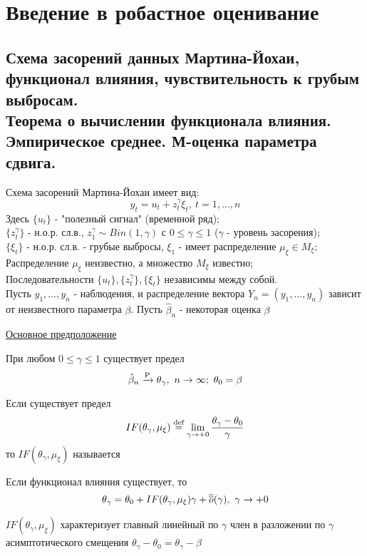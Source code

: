 \section{Введение в робастное оценивание}

\subsection{Схема засорений данных Мартина-Йохаи, функционал влияния,
чувствительность к грубым выбросам. \\
Теорема о вычислении функционала влияния. \\
Эмпирическое среднее. М-оценка параметра сдвига.}
Схема засорений Мартина-Йохаи имеет вид:
\[y_t = u_t + z^\gamma_t\xi_t,\ t = 1, \ldots, n\]
Здесь $\{u_t\}$ - "полезный сигнал" (временной ряд); \\
$\{z_t^\gamma\}$ - н.о.р. сл.в., $z_1^{\gamma} \sim Bin(1, \gamma)$
с $0 \leq \gamma\leq1$ ($\gamma$ - уровень засорения); \\
$\{\xi_t\}$ - н.о.р. сл.в. - грубые выбросы, $\xi_1$ - имеет распределение
$\mu_\xi\in M_\xi$;
Распределение $\mu_\xi$ неизвестно, а множество $M_\xi$ известно; \\
Последовательности $\{u_t\}, \{z^\gamma_t\}, \{\xi_t\}$ независимы между собой. \\
Пусть $y_1, \ldots, y_n$ - наблюдения, и распределение
вектора $Y_n=(y_1, \ldots, y_n)$ зависит от неизвестного параметра $\beta$.
Пусть $\hat{\beta}_n$ - некоторая оценка $\beta$

\underline{Основное предположение}

При любом $0 \leq \gamma\leq1$ существует предел
\[\hat{\beta}_n\xrightarrow{\P}\theta_\gamma,\ n\rightarrow\infty;\ \theta_0=\beta\]

\begin{definition}
    Если существует предел
    \[IF(\theta_\gamma, \mu_\xi)\stackrel{\text{def}}{=}\lim_{\gamma\rightarrow+0}\frac{\theta_\gamma-\theta_0}{\gamma}\]
    то $IF(\theta_\gamma, \mu_\xi)$ называется 
\end{definition}

Если функционал влияния существует, то 
\[\theta_\gamma = \theta_0 + IF(\theta_\gamma, \mu_\xi)\gamma + \overline{\overline{o}}(\gamma),\ \gamma\rightarrow+0\]
\begin{leftbar}
    $IF(\theta_\gamma, \mu_\xi)$ характеризует главный линейный по
    $\gamma$ член в разложении по $\gamma$ асимптотического смещения $\theta_\gamma - \theta_0=\theta_\gamma-\beta$
\end{leftbar}

